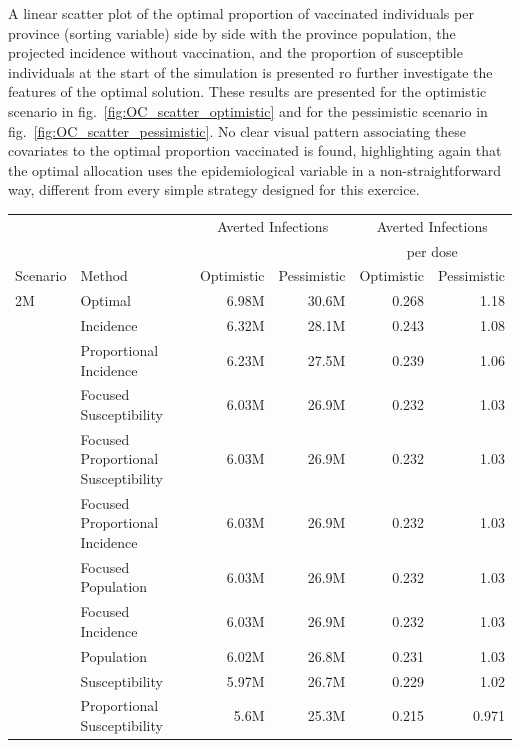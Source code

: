 A linear scatter plot of the optimal proportion of vaccinated individuals per province (sorting variable) side by side with the province population, the projected incidence without vaccination, and the proportion of susceptible individuals at the start of the simulation is presented ro further investigate the features of the optimal solution. These results are presented for the optimistic scenario in fig.~\ref{fig:OC_scatter_optimistic} and for the pessimistic scenario in fig.~\ref{fig:OC_scatter_pessimistic}. No clear visual pattern associating these covariates to the optimal proportion vaccinated is found, highlighting again that the optimal allocation uses the epidemiological variable in a non-straightforward way, different from every simple strategy designed for this exercice.

\begin{fwtable}
\centering
\small
\begin{tabular}{llrrrr}
\toprule
& {} & \multicolumn{2}{c}{Averted Infections} & \multicolumn{2}{c}{Averted Infections} \\
&    &  & & \multicolumn{2}{c}{per dose} \\
Scenario & Method &  Optimistic & Pessimistic &     Optimistic & Pessimistic          \\
\midrule
2M & Optimal &   6.98M &    30.6M &          0.268 &        1.18 \\
        & Incidence &   6.32M &    28.1M &          0.243 &        1.08 \\
        & Proportional Incidence &   6.23M &    27.5M &          0.239 &        1.06 \\
        & Focused Susceptibility &   6.03M &    26.9M &          0.232 &        1.03 \\
        & Focused Proportional Susceptibility &   6.03M &    26.9M &          0.232 &        1.03 \\
        & Focused Proportional Incidence &   6.03M &    26.9M &          0.232 &        1.03 \\
        & Focused Population &   6.03M &    26.9M &          0.232 &        1.03 \\
        & Focused Incidence &   6.03M &    26.9M &          0.232 &        1.03 \\
        & Population &   6.02M &    26.8M &          0.231 &        1.03 \\
        & Susceptibility &   5.97M &    26.7M &          0.229 &        1.02 \\
        & Proportional Susceptibility &    5.6M &    25.3M &          0.215 &       0.971 \\

\end{tabular}
\end{fwtable}
